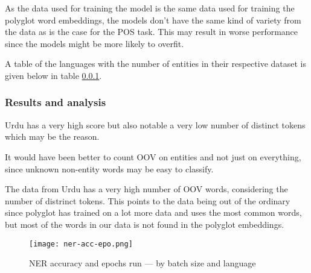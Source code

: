 As the data used for training the model is the same data used for training the
polyglot word embeddings, the models don't have the same kind of variety from
the data as is the case for the POS task. This may result in worse performance
since the models might be more likely to overfit.

A table of the languages with the number of entities in their respective dataset
is given below in table \ref{}.

\subsubsection{Results and analysis}

Urdu has a very high score but also notable a very low number of distinct tokens
which may be the reason.

It would have been better to count OOV on entities and not just on everything,
since unknown non-entity words may be easy to classify.

The data from Urdu has a very high number of OOV words, considering the number
of distrinct tokens. This points to the data being out of the ordinary since
polyglot has trained on a lot more data and uses the most common words, but 
most of the words in our data is not found in the polyglot embeddings.

\begin{figure}[h]
    \texttt{[image: ner-acc-epo.png]}
    \caption{NER accuracy and epochs run --- by batch size and language
    }\label{chart:ner-acc-epo}
\end{figure}

